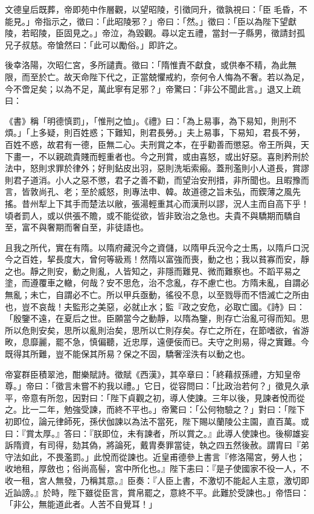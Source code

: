 \begin{pinyinscope}
 文德皇后既葬，帝即苑中作層觀，以望昭陵，引徵同升，徵孰視曰：「臣毛昏，不能見。」帝指示之，徵曰：「此昭陵邪？」帝曰：「然。」徵曰：「臣以為陛下望獻陵，若昭陵，臣固見之。」帝泣，為毀觀。尋以定五禮，當封一子縣男，徵請封孤兄子叔慈。帝愴然曰：「此可以勵俗。」即許之。



 後幸洛陽，次昭仁宮，多所譴責。徵曰：「隋惟責不獻食，或供奉不精，為此無限，而至於亡。故天命陛下代之，正當兢懼戒約，奈何令人悔為不奢。若以為足，今不啻足矣；以為不足，萬此寧有足邪？」帝驚曰：「非公不聞此言。」退又上疏曰：



 《書》稱「明德慎罰」，「惟刑之恤」。《禮》曰：「為上易事，為下易知，則刑不煩。」「上多疑，則百姓惑；下難知，則君長勞。」夫上易事，下易知，君長不勞，百姓不惑，故君有一德，臣無二心。夫刑賞之本，在乎勸善而懲惡。帝王所與，天下畫一，不以親疏貴賤而輕重者也。今之刑賞，或由喜怒，或出好惡。喜則矜刑於法中，怒則求罪於律外；好則鉆皮出羽，惡則洗垢索瘢。蓋刑濫則小人道長，賞謬則君子道消。小人之惡不懲，君子之善不勸，而望治安刑措，非所聞也。且暇豫而言，皆敦尚孔、老；至於威怒，則專法申、韓。故道德之旨未弘，而鍥薄之風先搖。昔州犁上下其手而楚法以敝，張湯輕重其心而漢刑以謬，況人主而自高下乎！頃者罰人，或以供張不贍，或不能從欲，皆非致治之急也。夫貴不與驕期而驕自至，富不與奢期而奢自至，非徒語也。



 且我之所代，實在有隋。以隋府藏況今之資儲，以隋甲兵況今之士馬，以隋戶口況今之百姓，挈長度大，曾何等級焉！然隋以富強而喪，動之也；我以貧寡而安，靜之也。靜之則安，動之則亂，人皆知之，非隱而難見、微而難察也。不蹈平易之塗，而遵覆車之轍，何哉？安不思危，治不念亂，存不慮亡也。方隋未亂，自謂必無亂；未亡，自謂必不亡。所以甲兵亟動，徭役不息，以至戮辱而不悟滅亡之所由也，豈不哀哉！夫監形之美惡，必就止水；監『政之安危，必取亡國。《詩》曰：「殷鑒不遠，在夏后之世。臣願當今之動靜，以隋為鑒，則存亡治亂可得而知。思所以危則安矣，思所以亂則治矣，思所以亡則存矣。存亡之所在，在節嗜欲，省游畋，息靡麗，罷不急，慎偏聽，近忠厚，遠便佞而已。夫守之則易，得之實難。今既得其所難，豈不能保其所易？保之不固，驕奢淫泆有以動之也。



 帝宴群臣積翠池，酣樂賦詩。徵賦《西漢》，其卒章曰：「終藉叔孫禮，方知皇帝尊。」帝曰：「徵言未嘗不約我以禮。」它日，從容問曰：「比政治若何？」徵見久承平，帝意有所忽，因對曰：「陛下貞觀之初，導人使諫。三年以後，見諫者悅而從之。比一二年，勉強受諫，而終不平也。」帝驚曰：「公何物驗之？」對曰：「陛下初即位，論元律師死，孫伏伽諫以為法不當死，陛下賜以蘭陵公主園，直百萬。或曰：『賞太厚。』答曰：『朕即位，未有諫者，所以賞之。』此導人使諫也。後柳雄妄訴隋資，有司得，劾其偽，將論死，戴胄奏罪當徒，執之四五然後赦。謂胄曰『弟守法如此，不畏濫罰。」此悅而從諫也。近皇甫德參上書言『修洛陽宮，勞人也；收地租，厚斂也；俗尚高髻，宮中所化也。』陛下恚曰：『是子使國家不役一人，不收一租，宮人無發，乃稱其意。』臣奏：『人臣上書，不激切不能起人主意，激切即近訕謗。』於時，陛下雖從臣言，賞帛罷之，意終不平。此難於受諫也。」帝悟曰：「非公，無能道此者。人苦不自覺耳！」




\end{pinyinscope}
